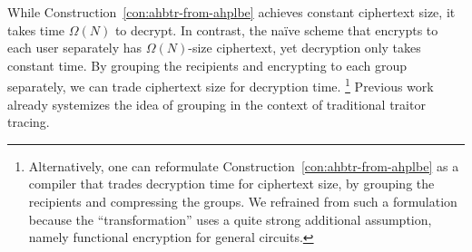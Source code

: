 While Construction~\ref{con:ahbtr-from-ahplbe} achieves constant ciphertext size,
it takes time $\Omega(N)$ to decrypt.
In contrast, the na{\"i}ve scheme that encrypts to each user separately has $\Omega(N)$-size ciphertext,
yet decryption only takes constant time.
By grouping the recipients and encrypting to each group separately,
we can trade ciphertext size for decryption time.%
\footnote{Alternatively, one can reformulate Construction~\ref{con:ahbtr-from-ahplbe} as a compiler that trades decryption time for ciphertext size, by grouping the recipients and compressing the groups.
We refrained from such a formulation because the ``transformation'' uses a quite strong additional assumption, namely functional encryption for general circuits.}
Previous work~\cite{C:Zhandry20} already systemizes the idea of grouping in the context of traditional traitor tracing.
